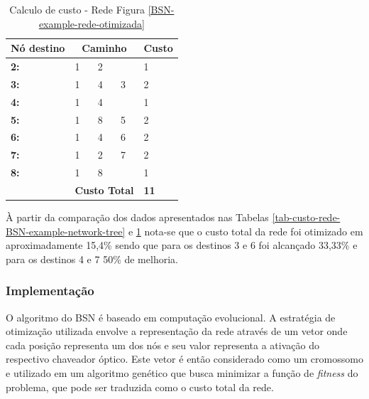 \documentclass[conference]{IEEEtran}
\begin{document}
\begin{table}[t!]
	\centering
			\begin{tabular}{lllll}
			\hline
			\multicolumn{1}{|l|}{\textbf{Nó destino}} & \multicolumn{3}{c}{\textbf{Caminho}} & \multicolumn{1}{c|}{\textbf{Custo}} \\ \hline
			\multicolumn{1}{|l|}{\textbf{2:}} & 1 & 2 & \multicolumn{1}{l|}{} & \multicolumn{1}{l|}{1} \\ \hline
			\multicolumn{1}{|l|}{\textbf{3:}} & 1 & 4 & \multicolumn{1}{l|}{3} & \multicolumn{1}{l|}{2} \\ \hline
			\multicolumn{1}{|l|}{\textbf{4:}} & 1 & 4 & \multicolumn{1}{l|}{} & \multicolumn{1}{l|}{1} \\ \hline
			\multicolumn{1}{|l|}{\textbf{5:}} & 1 & 8 & \multicolumn{1}{l|}{5} & \multicolumn{1}{l|}{2} \\ \hline
			\multicolumn{1}{|l|}{\textbf{6:}} & 1 & 4 & \multicolumn{1}{l|}{6} & \multicolumn{1}{l|}{2} \\ \hline
			\multicolumn{1}{|l|}{\textbf{7:}} & 1 & 2 & \multicolumn{1}{l|}{7} & \multicolumn{1}{l|}{2} \\ \hline
			\multicolumn{1}{|l|}{\textbf{8:}} & 1 & 8 & \multicolumn{1}{l|}{} & \multicolumn{1}{l|}{1} \\ \hline
			 & \multicolumn{3}{l}{\textbf{Custo Total}} & \textbf{11}
			\end{tabular}
	\caption{Calculo de custo - Rede Figura \ref{BSN-example-rede-otimizada}}
	\label{tab-custo-rede-bsn-otimizada}
	\label{tab_calc_custo}
\end{table}

À partir da comparação dos dados apresentados nas Tabelas \ref{tab-custo-rede-BSN-example-network-tree} e \ref{tab_calc_custo} nota-se que o custo total da rede foi otimizado em aproximadamente 15,4\% sendo que para os destinos 3 e 6 foi alcançado 33,33\% e para os destinos 4 e 7 50\% de melhoria.

\subsubsection{Implementação}
O algoritmo do BSN é baseado em computação evolucional. A estratégia de otimização utilizada envolve a representação da rede através de um vetor onde cada posição representa um dos nós e seu valor representa a ativação do respectivo chaveador óptico. Este vetor é então considerado como um cromossomo e utilizado em um algoritmo genético que busca minimizar a função de \emph{fitness} do problema, que pode ser traduzida como o custo total da rede. 
\end{document}
